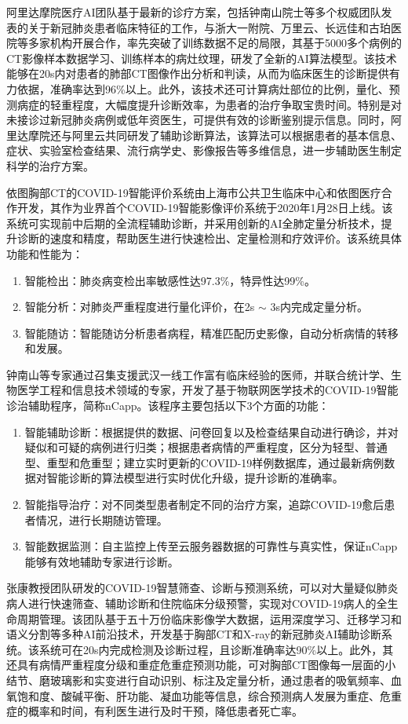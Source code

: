 \documentclass[journal,twoside,web]{ieeecolor}
\begin{document}
阿里达摩院医疗AI团队基于最新的诊疗方案，包括钟南山院士等多个权威团队发表的关于新冠肺炎患者临床特征的工作，与浙大一附院、万里云、长远佳和古珀医院等多家机构开展合作，率先突破了训练数据不足的局限，其基于5000多个病例的CT影像样本数据学习、训练样本的病灶纹理，研发了全新的AI算法模型。该技术能够在20s内对患者的肺部CT图像作出分析和判读，从而为临床医生的诊断提供有力依据，准确率达到96\%以上。此外，该技术还可计算病灶部位的比例，量化、预测病症的轻重程度，大幅度提升诊断效率，为患者的治疗争取宝贵时间。特别是对未接诊过新冠肺炎病例或低年资医生，可提供有效的诊断鉴别提示信息。同时，阿里达摩院还与阿里云共同研发了辅助诊断算法，该算法可以根据患者的基本信息、症状、实验室检查结果、流行病学史、影像报告等多维信息，进一步辅助医生制定科学的治疗方案。


依图胸部CT的COVID-19智能评价系统由上海市公共卫生临床中心和依图医疗合作开发，其作为业界首个COVID-19智能影像评价系统于2020年1月28日上线。该系统可实现前中后期的全流程辅助诊断，并采用创新的AI全肺定量分析技术，提升诊断的速度和精度，帮助医生进行快速检出、定量检测和疗效评价。该系统具体功能和性能为：

\begin{enumerate}
\item 智能检出：肺炎病变检出率敏感性达97.3\%，特异性达99\%。
\item 智能分析：对肺炎严重程度进行量化评价，在2s $ \sim $ 3s内完成定量分析。
\item 智能随访：智能随访分析患者病程，精准匹配历史影像，自动分析病情的转移和发展。
\end{enumerate}

钟南山等专家通过召集支援武汉一线工作富有临床经验的医师，并联合统计学、生物医学工程和信息技术领域的专家，开发了基于物联网医学技术的COVID-19智能诊治辅助程序，简称nCapp。该程序主要包括以下3个方面的功能：
\begin{enumerate}
\item 智能辅助诊断：根据提供的数据、问卷回复以及检查结果自动进行确诊，并对疑似和可疑的病例进行归类；根据患者病情的严重程度，区分为轻型、普通型、重型和危重型；建立实时更新的COVID-19样例数据库，通过最新病例数据对智能诊断的算法模型进行实时优化升级，提升诊断的准确率。
\item 智能指导治疗：对不同类型患者制定不同的治疗方案，追踪COVID-19愈后患者情况，进行长期随访管理。
\item 智能数据监测：自主监控上传至云服务器数据的可靠性与真实性，保证nCapp能够有效地辅助专家进行诊断。
\end{enumerate}

张康教授团队研发的COVID-19智慧筛查、诊断与预测系统，可以对大量疑似肺炎病人进行快速筛查、辅助诊断和住院临床分级预警，实现对COVID-19病人的全生命周期管理。该团队基于五十万份临床影像学大数据，运用深度学习、迁移学习和语义分割等多种AI前沿技术，开发基于胸部CT和X-ray的新冠肺炎AI辅助诊断系统。该系统可在20s内完成检测及诊断过程，且诊断准确率达90\%以上。此外，其还具有病情严重程度分级和重症危重症预测功能，可对胸部CT图像每一层面的小结节、磨玻璃影和实变进行自动识别、标注及定量分析，通过患者的吸氧频率、血氧饱和度、酸碱平衡、肝功能、凝血功能等信息，综合预测病人发展为重症、危重症的概率和时间，有利医生进行及时干预，降低患者死亡率。
\end{document}
